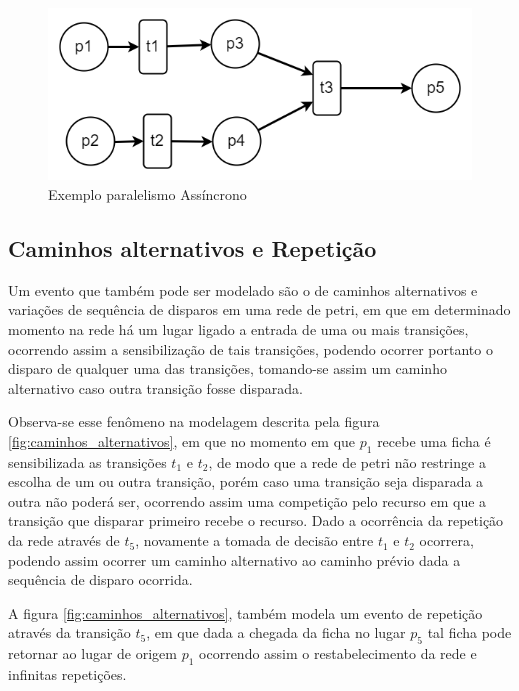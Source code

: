 \begin{figure}[h]
    \centering
    \includegraphics[scale=0.4]{figures/Petri/paralelismo_assincrono.png}
    \caption{Exemplo paralelismo Assíncrono}
    \label{fig:paralelismo_assincrono}
\end{figure}


\subsection{Caminhos alternativos e Repetição}
Um evento que também pode ser modelado são o de caminhos alternativos e variações de sequência de disparos em uma rede de petri, em que em determinado momento na rede há um lugar ligado a entrada de uma ou mais transições, ocorrendo assim a sensibilização de tais transições, podendo ocorrer portanto o disparo de qualquer uma das transições, tomando-se assim um caminho alternativo caso outra transição fosse disparada.

Observa-se esse fenômeno na modelagem descrita pela figura \ref{fig:caminhos_alternativos}, em que no momento em que $p_1$ recebe uma ficha é sensibilizada as transições $t_1$ e $t_2$, de modo que a rede de petri não restringe a escolha de um ou outra transição, porém caso uma transição seja disparada a outra não poderá ser, ocorrendo assim uma competição pelo recurso em que a transição que disparar primeiro recebe o recurso. Dado a ocorrência da repetição da rede através de $t_5$, novamente a tomada de decisão entre $t_1$ e $t_2$ ocorrera, podendo assim ocorrer um caminho alternativo ao caminho prévio dada a sequência de disparo ocorrida.

A figura \ref{fig:caminhos_alternativos}, também modela um evento de repetição através da transição $t_5$, em que dada a chegada da ficha no lugar $p_5$ tal ficha pode retornar ao lugar de origem $p_1$ ocorrendo assim o restabelecimento da rede e infinitas repetições.

